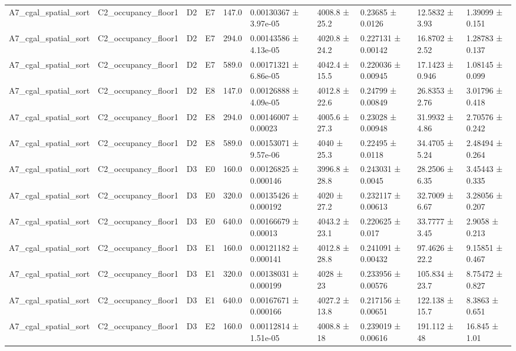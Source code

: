 \begin{table}
\begin{tabular}{llllllllll}
A7\_cgal\_spatial\_sort & C2\_occupancy\_floor1 & D2 & E7 & 147.0 & 0.00130367 ± 3.97e-05 & 4008.8 ± 25.2 & 0.23685 ± 0.0126 & 12.5832 ± 3.93 & 1.39099 ± 0.151 \\
A7\_cgal\_spatial\_sort & C2\_occupancy\_floor1 & D2 & E7 & 294.0 & 0.00143586 ± 4.13e-05 & 4020.8 ± 24.2 & 0.227131 ± 0.00142 & 16.8702 ± 2.52 & 1.28783 ± 0.137 \\
A7\_cgal\_spatial\_sort & C2\_occupancy\_floor1 & D2 & E7 & 589.0 & 0.00171321 ± 6.86e-05 & 4042.4 ± 15.5 & 0.220036 ± 0.00945 & 17.1423 ± 0.946 & 1.08145 ± 0.099 \\
A7\_cgal\_spatial\_sort & C2\_occupancy\_floor1 & D2 & E8 & 147.0 & 0.00126888 ± 4.09e-05 & 4012.8 ± 22.6 & 0.24799 ± 0.00849 & 26.8353 ± 2.76 & 3.01796 ± 0.418 \\
A7\_cgal\_spatial\_sort & C2\_occupancy\_floor1 & D2 & E8 & 294.0 & 0.00146007 ± 0.00023 & 4005.6 ± 27.3 & 0.23028 ± 0.00948 & 31.9932 ± 4.86 & 2.70576 ± 0.242 \\
A7\_cgal\_spatial\_sort & C2\_occupancy\_floor1 & D2 & E8 & 589.0 & 0.00153071 ± 9.57e-06 & 4040 ± 25.3 & 0.22495 ± 0.0118 & 34.4705 ± 5.24 & 2.48494 ± 0.264 \\
A7\_cgal\_spatial\_sort & C2\_occupancy\_floor1 & D3 & E0 & 160.0 & 0.00126825 ± 0.000146 & 3996.8 ± 28.8 & 0.243031 ± 0.0045 & 28.2506 ± 6.35 & 3.45443 ± 0.335 \\
A7\_cgal\_spatial\_sort & C2\_occupancy\_floor1 & D3 & E0 & 320.0 & 0.00135426 ± 0.000192 & 4020 ± 27.2 & 0.232117 ± 0.00613 & 32.7009 ± 6.67 & 3.28056 ± 0.207 \\
A7\_cgal\_spatial\_sort & C2\_occupancy\_floor1 & D3 & E0 & 640.0 & 0.00166679 ± 0.00013 & 4043.2 ± 23.1 & 0.220625 ± 0.017 & 33.7777 ± 3.45 & 2.9058 ± 0.213 \\
A7\_cgal\_spatial\_sort & C2\_occupancy\_floor1 & D3 & E1 & 160.0 & 0.00121182 ± 0.000141 & 4012.8 ± 28.8 & 0.241091 ± 0.00432 & 97.4626 ± 22.2 & 9.15851 ± 0.467 \\
A7\_cgal\_spatial\_sort & C2\_occupancy\_floor1 & D3 & E1 & 320.0 & 0.00138031 ± 0.000199 & 4028 ± 23 & 0.233956 ± 0.00576 & 105.834 ± 23.7 & 8.75472 ± 0.827 \\
A7\_cgal\_spatial\_sort & C2\_occupancy\_floor1 & D3 & E1 & 640.0 & 0.00167671 ± 0.000166 & 4027.2 ± 13.8 & 0.217156 ± 0.00651 & 122.138 ± 15.7 & 8.3863 ± 0.651 \\
A7\_cgal\_spatial\_sort & C2\_occupancy\_floor1 & D3 & E2 & 160.0 & 0.00112814 ± 1.51e-05 & 4008.8 ± 18 & 0.239019 ± 0.00616 & 191.112 ± 48 & 16.845 ± 1.01 \\

\end{tabular}
\end{table}
